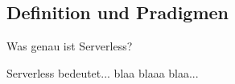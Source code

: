 \subsection{Definition und Pradigmen}

Was genau ist Serverless?

Serverless bedeutet... blaa blaaa blaa...

